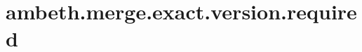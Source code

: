 \section{ambeth.merge.exact.version.required}
\label{configuration:AmbethMergeExactVersionRequired}
\TODO
